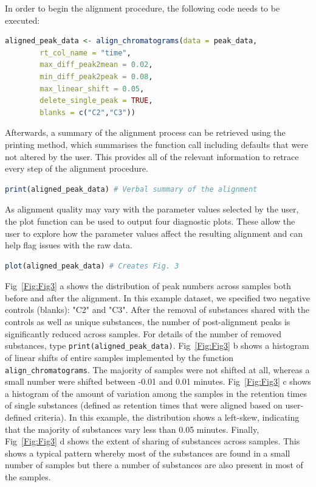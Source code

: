 \documentclass[10pt,letterpaper]{article}
\begin{document}
In order to begin the alignment procedure, the following code needs to be executed:

\begin{lstlisting}[language=R]
aligned_peak_data <- align_chromatograms(data = peak_data,
        rt_col_name = "time",
        max_diff_peak2mean = 0.02, 
        min_diff_peak2peak = 0.08, 
        max_linear_shift = 0.05, 
        delete_single_peak = TRUE, 
        blanks = c("C2","C3")) 
\end{lstlisting}

Afterwards, a summary of the alignment process can be retrieved using the printing method, which summarises the function call including defaults that were not altered by the user. This provides all of the relevant information to retrace every step of the alignment procedure.

\begin{lstlisting}[language=R]
print(aligned_peak_data) # Verbal summary of the alignment
\end{lstlisting}

As alignment quality may vary with the parameter values selected by the user, the plot function can be used to output four diagnostic plots.  These allow the user to explore how the parameter values affect the resulting alignment and can help flag issues with the raw data.

\begin{lstlisting}[language=R]
plot(aligned_peak_data) # Creates Fig. 3
\end{lstlisting}

Fig~\ref{Fig:Fig3} a shows the distribution of peak numbers across samples both before and after the alignment.  In this example dataset, we specified two negative controls (blanks): "C2" and "C3".  After the removal of substances shared with the controls as well as unique substances, the number of post-alignment peaks is significantly reduced across samples.  For details of the number of removed substances, type \texttt{print(aligned\_peak\_data)}. Fig~\ref{Fig:Fig3} b shows a histogram of linear shifts of entire samples implemented by the function \texttt{align\_chromatograms}. The majority of samples were not shifted at all, whereas a small number were shifted between -0.01 and 0.01 minutes. Fig~\ref{Fig:Fig3} c shows a histogram of the amount of variation among the samples in the retention times of single substances (defined as retention times that were aligned based on user-defined criteria). In this example, the distribution shows a left-skew, indicating that the majority of substances vary less than 0.05 minutes. Finally, Fig~\ref{Fig:Fig3} d shows the extent of sharing of substances across samples. This shows a typical pattern whereby most of the substances are found in a small number of samples but there a number of substances are also present in most of the samples.
\end{document}
